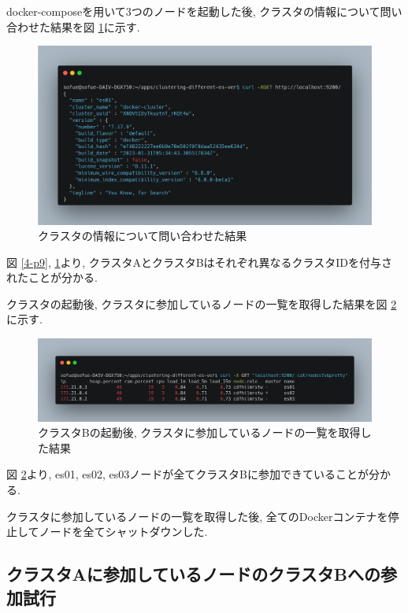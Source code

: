 docker-composeを用いて3つのノードを起動した後, クラスタの情報について問い合わせた結果を図 \ref{4-p11}に示す.

\begin{figure}
  \begin{center}
    \includegraphics[width=120mm]{sotu/figure/3nodes-cluster.png}
    \caption{クラスタの情報について問い合わせた結果}
    \label{4-p11}
  \end{center}
\end{figure}

図 \ref{4-p9}, \ref{4-p11}より, クラスタAとクラスタBはそれぞれ異なるクラスタIDを付与されたことが分かる.

クラスタの起動後, クラスタに参加しているノードの一覧を取得した結果を図 \ref{4-p12}に示す.

\begin{figure}
  \begin{center}
    \includegraphics[width=120mm]{sotu/figure/3nodes-list.png}
    \caption{クラスタBの起動後, クラスタに参加しているノードの一覧を取得した結果}
    \label{4-p12}
  \end{center}
\end{figure}

図 \ref{4-p12}より, es01, es02, es03ノードが全てクラスタBに参加できていることが分かる.

クラスタに参加しているノードの一覧を取得した後, 全てのDockerコンテナを停止してノードを全てシャットダウンした.

\subsection{クラスタAに参加しているノードのクラスタBへの参加試行}

